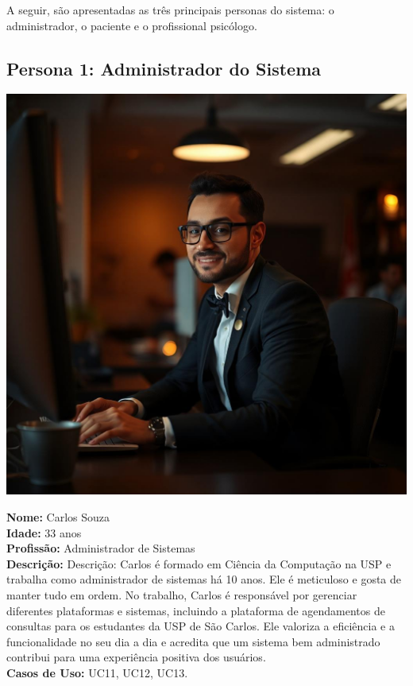 \documentclass[a4paper,12pt]{report}
\begin{document}
A seguir, são apresentadas as três principais personas do sistema: o administrador, o paciente e o profissional psicólogo.


\subsection{Persona 1: Administrador do Sistema}
\begin{minipage}{0.3\textwidth}
    \centering
    \includegraphics[width=1.0\textwidth]{fotor-ai-20240915202734.jpg}
\end{minipage}
\hfill
\begin{minipage}{0.65\textwidth}
    \textbf{Nome:} Carlos Souza \\
    \textbf{Idade:} 33 anos \\
    \textbf{Profissão:} Administrador de Sistemas \\
    \textbf{Descrição:} Descrição: Carlos é formado em Ciência da Computação na USP e trabalha como administrador de sistemas há 10 anos. Ele é meticuloso e gosta de manter tudo em ordem. No trabalho, Carlos é responsável por gerenciar diferentes plataformas e sistemas, incluindo a plataforma de agendamentos de consultas para os estudantes da USP de São Carlos. Ele valoriza a eficiência e a funcionalidade no seu dia a dia e acredita que um sistema bem administrado contribui para uma experiência positiva dos usuários.\\
    \textbf{Casos de Uso:} UC11, UC12, UC13.
\end{minipage}
\end{document}
